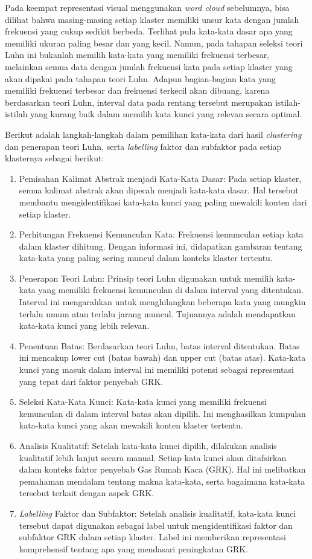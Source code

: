Pada keempat representasi visual menggunakan \textit{word cloud} sebelumnya, bisa dilihat bahwa masing-masing setiap klaster memiliki unsur kata dengan jumlah frekuensi yang cukup sedikit berbeda. Terlihat pula kata-kata dasar apa yang memiliki ukuran paling besar dan yang kecil. Namun, pada tahapan seleksi teori Luhn ini bukanlah memilih kata-kata yang memiliki frekuensi terbesar, melainkan semua data dengan jumlah frekuensi kata pada setiap klaster yang akan dipakai pada tahapan teori Luhn. Adapun bagian-bagian kata yang memiliki frekuensi terbesar dan frekuensi terkecil akan dibuang, karena berdasarkan teori Luhn, interval data pada rentang tersebut merupakan istilah-istilah yang kurang baik dalam memilih kata kunci yang relevan secara optimal.

Berikut adalah langkah-langkah dalam pemilihan kata-kata dari hasil \textit{clustering} dan penerapan teori Luhn, serta \textit{labelling} faktor dan subfaktor pada setiap klasternya sebagai berikut:

\begin{enumerate}
    \item Pemisahan Kalimat Abstrak menjadi Kata-Kata Dasar: Pada setiap klaster, semua kalimat abstrak akan dipecah menjadi kata-kata dasar. Hal tersebut membantu mengidentifikasi kata-kata kunci yang paling mewakili konten dari setiap klaster.
    \item Perhitungan Frekuensi Kemunculan Kata: Frekuensi kemunculan setiap kata dalam klaster dihitung. Dengan informasi ini, didapatkan gambaran tentang kata-kata yang paling sering muncul dalam konteks klaster tertentu.
    \item Penerapan Teori Luhn: Prinsip teori Luhn digunakan untuk memilih kata-kata yang memiliki frekuensi kemunculan di dalam interval yang ditentukan. Interval ini mengarahkan untuk menghilangkan beberapa kata yang mungkin terlalu umum atau terlalu jarang muncul. Tujuannya adalah mendapatkan kata-kata kunci yang lebih relevan.
    \item Penentuan Batas: Berdasarkan teori Luhn, batas interval ditentukan. Batas ini mencakup lower cut (batas bawah) dan upper cut (batas atas). Kata-kata kunci yang masuk dalam interval ini memiliki potensi sebagai representasi yang tepat dari faktor penyebab GRK.
    \item Seleksi Kata-Kata Kunci: Kata-kata kunci yang memiliki frekuensi kemunculan di dalam interval batas akan dipilih. Ini menghasilkan kumpulan kata-kata kunci yang akan mewakili konten klaster tertentu.
    \item Analisis Kualitatif: Setelah kata-kata kunci dipilih, dilakukan analisis kualitatif lebih lanjut secara manual. Setiap kata kunci akan ditafsirkan dalam konteks faktor penyebab Gas Rumah Kaca (GRK). Hal ini melibatkan pemahaman mendalam tentang makna kata-kata, serta bagaimana kata-kata tersebut terkait dengan aspek GRK.
    \item \textit{Labelling} Faktor dan Subfaktor: Setelah analisis kualitatif, kata-kata kunci tersebut dapat digunakan sebagai label untuk mengidentifikasi faktor dan subfaktor GRK dalam setiap klaster. Label ini memberikan representasi komprehensif tentang apa yang mendasari peningkatan GRK.
\end{enumerate}

